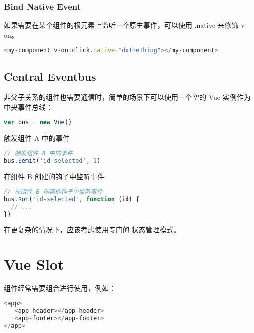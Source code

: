 \subsection{Bind Native Event}

如果需要在某个组件的根元素上监听一个原生事件，可以使用 .native 来修饰 v-on。


\begin{lstlisting}[language=JavaScript]
<my-component v-on:click.native="doTheThing"></my-component>
\end{lstlisting}



\section{Central Eventbus}

非父子关系的组件也需要通信时，简单的场景下可以使用一个空的 Vue 实例作为中央事件总线：



\begin{lstlisting}[language=JavaScript]
var bus = new Vue()
\end{lstlisting}

\begin{compactitem}
\item 触发组件 A 中的事件

\begin{lstlisting}[language=JavaScript]
// 触发组件 A 中的事件
bus.$emit('id-selected', 1)
\end{lstlisting}

\item 在组件 B 创建的钩子中监听事件

\begin{lstlisting}[language=JavaScript]
// 在组件 B 创建的钩子中监听事件
bus.$on('id-selected', function (id) {
  // ...
})
\end{lstlisting}
\end{compactitem}

在更复杂的情况下，应该考虑使用专门的 状态管理模式。


\chapter{Vue Slot}

组件经常需要组合进行使用，例如：

\begin{lstlisting}[language=JavaScript]
<app>
   <app-header></app-header>
   <app-footer></app-footer>
</app>
\end{lstlisting}

